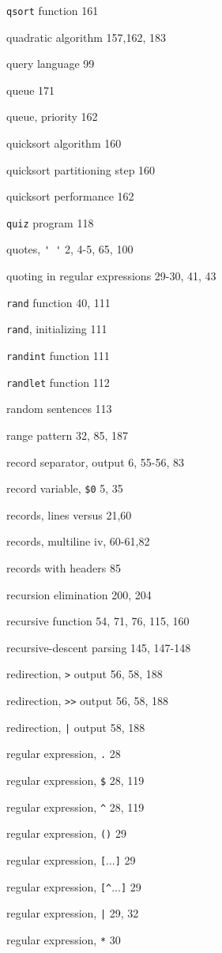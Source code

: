 \begin{multicols}{2}
\verb'qsort' function 161

quadratic algorithm 157,162, 183

query language 99

queue 171

queue, priority 162

quicksort algorithm 160

quicksort partitioning step 160

quicksort performance 162

\verb'quiz' program 118

quotes, \verb"' '" 2, 4-5, 65, 100

quoting in regular expressions 29-30, 41, 43

\verb'rand' function 40, 111

\verb'rand', initializing 111

\verb'randint' function 111

\verb'randlet' function 112

random sentences 113

range pattern 32, 85, 187

record separator, output 6, 55-56, 83

record variable, \verb'$0' 5, 35

records, lines versus 21,60

records, multiline iv, 60-61,82

records with headers 85

recursion elimination 200, 204

recursive function 54, 71, 76, 115, 160

recursive-descent parsing 145, 147-148

redirection, \verb'>' output 56, 58, 188

redirection, \verb'>>' output 56, 58, 188

redirection, \verb'|' output 58, 188

regular expression, \verb'.' 28

regular expression, \verb'$' 28, 119

regular expression, \verb'^' 28, 119

regular expression, \verb'()' 29

regular expression, \verb'['...\verb']' 29

regular expression, \verb'[^'...\verb']' 29

regular expression, \verb'|' 29, 32

regular expression, \verb'*' 30


\end{multicols}

